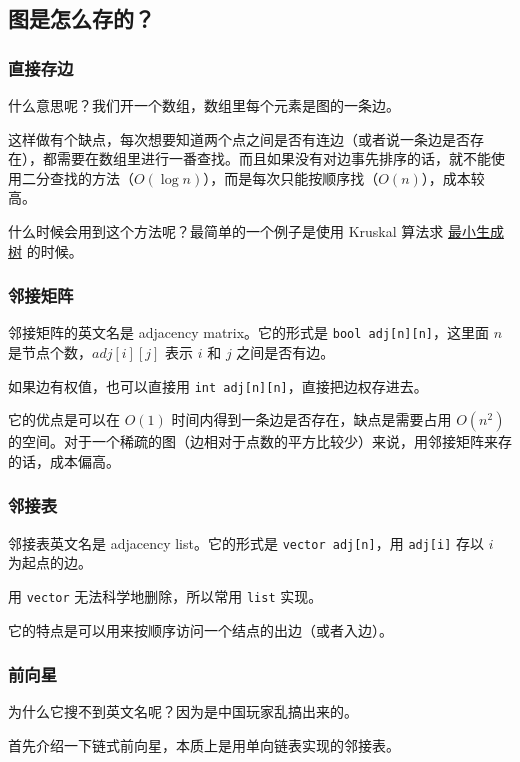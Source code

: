 
\subsection{图是怎么存的？}

\subsubsection{直接存边}

什么意思呢？我们开一个数组，数组里每个元素是图的一条边。

这样做有个缺点，每次想要知道两个点之间是否有连边（或者说一条边是否存在），都需要在数组里进行一番查找。而且如果没有对边事先排序的话，就不能使用二分查找的方法（$O(\log n)$），而是每次只能按顺序找（$O(n)$），成本较高。

什么时候会用到这个方法呢？最简单的一个例子是使用 Kruskal 算法求 \href{/graph/mst}{最小生成树} 的时候。

\subsubsection{邻接矩阵}

邻接矩阵的英文名是 adjacency matrix。它的形式是 \texttt{bool adj[n][n]}，这里面 $n$ 是节点个数，$adj[i][j]$ 表示 $i$ 和 $j$ 之间是否有边。

如果边有权值，也可以直接用 \texttt{int adj[n][n]}，直接把边权存进去。

它的优点是可以在 $O(1)$ 时间内得到一条边是否存在，缺点是需要占用 $O(n^2)$ 的空间。对于一个稀疏的图（边相对于点数的平方比较少）来说，用邻接矩阵来存的话，成本偏高。

\subsubsection{邻接表}

邻接表英文名是 adjacency list。它的形式是 \texttt{vector adj[n]}，用 \texttt{adj[i]} 存以 $i$ 为起点的边。

用 \texttt{vector} 无法科学地删除，所以常用 \texttt{list} 实现。

它的特点是可以用来按顺序访问一个结点的出边（或者入边）。

\subsubsection{前向星}

为什么它搜不到英文名呢？因为是中国玩家乱搞出来的。

首先介绍一下链式前向星，本质上是用单向链表实现的邻接表。

